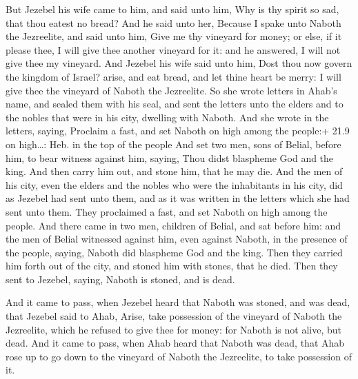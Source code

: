  But Jezebel his wife came to him, and said unto him, Why
is thy spirit so sad, that thou eatest no bread?  And he
said unto her, Because I spake unto Naboth the Jezreelite, and said unto
him, Give me thy vineyard for money; or else, if it please thee, I will
give thee another vineyard for it: and he answered, I will not give thee
my vineyard.  And Jezebel his wife said unto him, Dost thou
now govern the kingdom of Israel? arise, and eat bread, and let thine
heart be merry: I will give thee the vineyard of Naboth the Jezreelite.
 So she wrote letters in Ahab's name, and sealed them with
his seal, and sent the letters unto the elders and to the nobles that
were in his city, dwelling with Naboth.  And she wrote in
the letters, saying, Proclaim a fast, and set Naboth on high among the
people:+ 21.9 on high\ldots: Heb. in the top of the people 
And set two men, sons of Belial, before him, to bear witness against
him, saying, Thou didst blaspheme God and the king. And then carry him
out, and stone him, that he may die.  And the men of his
city, even the elders and the nobles who were the inhabitants in his
city, did as Jezebel had sent unto them, and as it was written in the
letters which she had sent unto them.  They proclaimed a
fast, and set Naboth on high among the people.  And there
came in two men, children of Belial, and sat before him: and the men of
Belial witnessed against him, even against Naboth, in the presence of
the people, saying, Naboth did blaspheme God and the king. Then they
carried him forth out of the city, and stoned him with stones, that he
died.  Then they sent to Jezebel, saying, Naboth is stoned,
and is dead.

 And it came to pass, when Jezebel heard that Naboth was
stoned, and was dead, that Jezebel said to Ahab, Arise, take possession
of the vineyard of Naboth the Jezreelite, which he refused to give thee
for money: for Naboth is not alive, but dead.  And it came
to pass, when Ahab heard that Naboth was dead, that Ahab rose up to go
down to the vineyard of Naboth the Jezreelite, to take possession of it.

